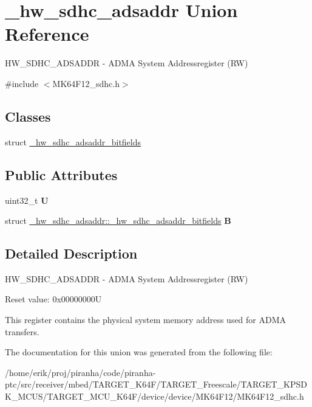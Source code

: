 \hypertarget{union__hw__sdhc__adsaddr}{}\section{\+\_\+hw\+\_\+sdhc\+\_\+adsaddr Union Reference}
\label{union__hw__sdhc__adsaddr}


H\+W\+\_\+\+S\+D\+H\+C\+\_\+\+A\+D\+S\+A\+D\+DR -\/ A\+D\+MA System Addressregister (RW)  




{\ttfamily \#include $<$M\+K64\+F12\+\_\+sdhc.\+h$>$}

\subsection*{Classes}
\begin{DoxyCompactItemize}
\item 
struct \hyperlink{struct__hw__sdhc__adsaddr_1_1__hw__sdhc__adsaddr__bitfields}{\+\_\+hw\+\_\+sdhc\+\_\+adsaddr\+\_\+bitfields}
\end{DoxyCompactItemize}
\subsection*{Public Attributes}
\begin{DoxyCompactItemize}
\item 
uint32\+\_\+t {\bfseries U}\hypertarget{union__hw__sdhc__adsaddr_a4471846df0c2b515258486c669fc774b}{}\label{union__hw__sdhc__adsaddr_a4471846df0c2b515258486c669fc774b}

\item 
struct \hyperlink{struct__hw__sdhc__adsaddr_1_1__hw__sdhc__adsaddr__bitfields}{\+\_\+hw\+\_\+sdhc\+\_\+adsaddr\+::\+\_\+hw\+\_\+sdhc\+\_\+adsaddr\+\_\+bitfields} {\bfseries B}\hypertarget{union__hw__sdhc__adsaddr_ad5899958db626cedac03d50bbad0607e}{}\label{union__hw__sdhc__adsaddr_ad5899958db626cedac03d50bbad0607e}

\end{DoxyCompactItemize}


\subsection{Detailed Description}
H\+W\+\_\+\+S\+D\+H\+C\+\_\+\+A\+D\+S\+A\+D\+DR -\/ A\+D\+MA System Addressregister (RW) 

Reset value\+: 0x00000000U

This register contains the physical system memory address used for A\+D\+MA transfers. 

The documentation for this union was generated from the following file\+:\begin{DoxyCompactItemize}
\item 
/home/erik/proj/piranha/code/piranha-\/ptc/src/receiver/mbed/\+T\+A\+R\+G\+E\+T\+\_\+\+K64\+F/\+T\+A\+R\+G\+E\+T\+\_\+\+Freescale/\+T\+A\+R\+G\+E\+T\+\_\+\+K\+P\+S\+D\+K\+\_\+\+M\+C\+U\+S/\+T\+A\+R\+G\+E\+T\+\_\+\+M\+C\+U\+\_\+\+K64\+F/device/device/\+M\+K64\+F12/M\+K64\+F12\+\_\+sdhc.\+h\end{DoxyCompactItemize}
